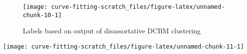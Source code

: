 \documentclass[
  11pt,
]{article}
\begin{document}
\begin{figure}[H]

{\centering \texttt{[image: curve-fitting-scratch\_files/figure-latex/unnamed-chunk-10-1]} 

}

\caption{Labels based on output of disassortative DCBM clustering}\label{fig:unnamed-chunk-10}
\end{figure}

\begin{center}\texttt{[image: curve-fitting-scratch\_files/figure-latex/unnamed-chunk-11-1]} \end{center}

  
\end{document}

